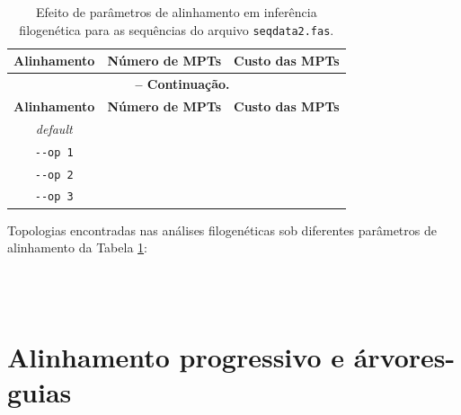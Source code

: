 \begin{refsection}
\begin{center}
\begin{longtable}{|c|c|c|}
\caption[Efeito de parâmetros de alinhamento em inferência filogenética]{Efeito de parâmetros de alinhamento em inferência filogenética para as sequências do arquivo \texttt{seqdata2.fas}.} \label{tut8:table:par} \\


\hline\hline \textbf{Alinhamento} & \textbf{Número de MPTs}  & \textbf{Custo das MPTs}\\
\endfirsthead

\multicolumn{3}{c}{{\bfseries \tablename\ \thetable{} -- Continuação.}}\\
\hline\hline \textbf{Alinhamento} & \textbf{Número de MPTs} & \textbf{Custo das MPTs}\\
\endhead
\hline \hline
\endlastfoot

\hline \textit{default} &  & \\
\hline \texttt{-{}-op 1} &  & \\
\hline \texttt{-{}-op 2} &  & \\
\hline \texttt{-{}-op 3} &  & \\

\end{longtable}
\end{center}


Topologias encontradas nas análises filogenéticas sob diferentes parâmetros de alinhamento da Tabela \ref{tut8:table:par}:

\begin{center}
\\
\\
\end{center}

\section{Alinhamento progressivo e árvores-guias}\label{tut8:guide_tree}


\end{refsection}
